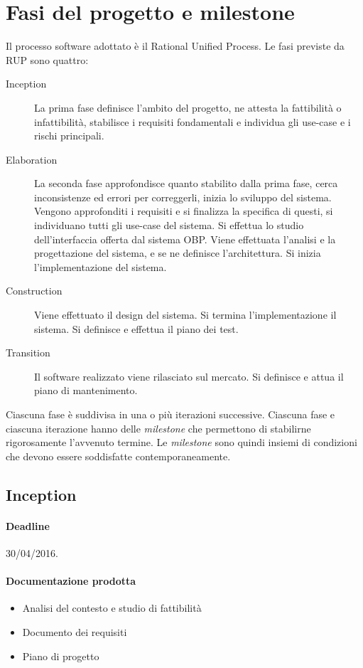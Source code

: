 \section{Fasi del progetto e milestone}

Il processo software adottato \`e il Rational Unified Process.
Le fasi previste da RUP sono quattro:
\begin{description}
	\item[Inception]
	La prima fase definisce l'ambito del progetto, ne attesta la fattibilit\`a o infattibilit\`a, stabilisce i requisiti fondamentali e individua gli use-case e i rischi principali.
	\item[Elaboration]
	La seconda fase approfondisce quanto stabilito dalla prima fase, cerca inconsistenze ed errori per correggerli, inizia lo sviluppo del sistema.
	Vengono approfonditi i requisiti e si finalizza la specifica di questi, si individuano tutti gli use-case del sistema.
	Si effettua lo studio dell'interfaccia offerta dal sistema OBP.
	Viene effettuata l'analisi e la progettazione del sistema, e se ne definisce l'architettura.
	Si inizia l'implementazione del sistema.
	\item[Construction]
	Viene effettuato il design del sistema.
	Si termina l'implementazione il sistema.
	Si definisce e effettua il piano dei test.
	\item[Transition]
	Il software realizzato viene rilasciato sul mercato.
	Si definisce e attua il piano di mantenimento.
\end{description}

Ciascuna fase \`e suddivisa in una o pi\`u iterazioni successive.
Ciascuna fase e ciascuna iterazione hanno delle \emph{milestone} che permettono di stabilirne rigorosamente l'avvenuto termine.
Le \emph{milestone} sono quindi insiemi di condizioni che devono essere soddisfatte contemporaneamente.

\subsection{Inception}

\paragraph{Deadline}
30/04/2016.

\paragraph{Documentazione prodotta}
\begin{itemize}
	\item Analisi del contesto e studio di fattibilit\`a
	\item Documento dei requisiti
	\item Piano di progetto
\end{itemize}

